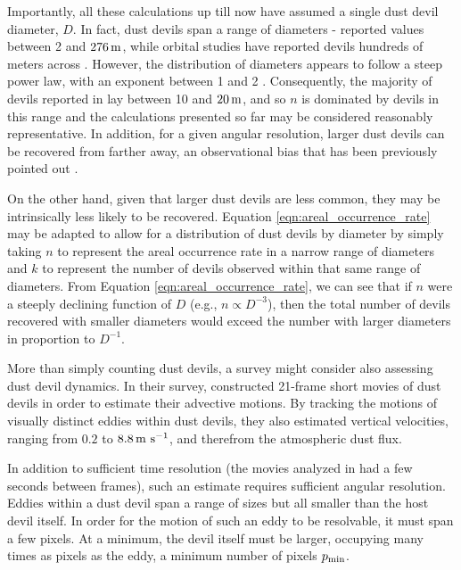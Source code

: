 \documentclass{aastex63}
\begin{document}
Importantly, all these calculations up till now have assumed a single dust devil diameter, $D$. In fact, dust devils span a range of diameters - \citet{2006JGRE..11112S09G} reported values between 2 and $276\,{\rm m}$, while orbital studies have reported devils hundreds of meters across \citep{2008Icar..197...39S}. However, the distribution of diameters appears to follow a steep power law, with an exponent between 1 and 2 \citep{2016SSRv..203..277L}. Consequently, the majority of devils reported in \citet{2006JGRE..11112S09G} lay between 10 and $20\,{\rm m}$, and so $n$ is dominated by devils in this range and the calculations presented so far may be considered reasonably representative. In addition, for a given angular resolution, larger dust devils can be recovered from farther away, an observational bias that has been previously pointed out \citep{2012Icar..219..556K, 2013Icar..226..964L}.

On the other hand, given that larger dust devils are less common, they may be intrinsically less likely to be recovered. Equation \ref{eqn:areal_occurrence_rate} may be adapted to allow for a distribution of dust devils by diameter by simply taking $n$ to represent the areal occurrence rate in a narrow range of diameters and $k$ to represent the number of devils observed within that same range of diameters. From Equation \ref{eqn:areal_occurrence_rate}, we can see that if $n$ were a steeply declining function of $D$ (e.g., $n \propto D^{-3}$), then the total number of devils recovered with smaller diameters would exceed the number with larger diameters in proportion to $D^{-1}$.

More than simply counting dust devils, a survey might consider also assessing dust devil dynamics. In their survey, \citet{2006JGRE..11112S09G} constructed 21-frame short movies of dust devils in order to estimate their advective motions. By tracking the motions of visually distinct eddies within dust devils, they also estimated vertical velocities, ranging from $0.2$ to $8.8\,{\rm m\ s^{-1}}$, and therefrom the atmospheric dust flux. 

In addition to sufficient time resolution (the movies analyzed in \citealt{2006JGRE..11112S09G} had a few seconds between frames), such an estimate requires sufficient angular resolution. Eddies within a dust devil span a range of sizes but all smaller than the host devil itself. In order for the motion of such an eddy to be resolvable, it must span a few pixels. At a minimum, the devil itself must be larger, occupying many times as pixels as the eddy, a minimum number of pixels $p_{\rm min}$.
\end{document}
